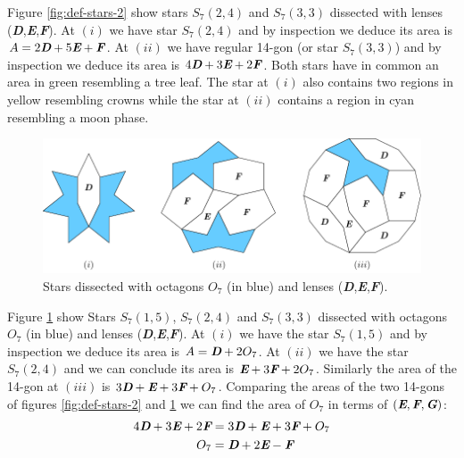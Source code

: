 \documentclass[11pt]{article}
\def\mathbi#1{\textbf{\em #1}}
\begin{document}
Figure \ref{fig:def-stars-2} show stars $S_7(2,4)$ and $S_7(3,3)$ dissected with lenses (\mathbi{D},\mathbi{E},\mathbi{F}).
At $(i)$ we have star $S_7(2,4)$ and by inspection we deduce its area is $A = 2\mathbi{D} + 5\mathbi{E} + \mathbi{F}$. At $(ii)$ we have regular 14-gon (or star $S_7(3,3)$) and by inspection we deduce its area is $4\mathbi{D} + 3\mathbi{E} + 2\mathbi{F}$. Both stars have in common an area in green resembling a tree leaf. The star at $(i)$ also contains two regions in yellow resembling crowns while the star at $(ii)$ contains a region in cyan resembling a moon phase.

\begin{figure}[H]
\centering
\includegraphics[scale=1.1]{def/def-stars-3}
\caption{Stars dissected with octagons \mathbi{$O_7$} (in blue) and lenses (\mathbi{D},\mathbi{E},\mathbi{F}).}
\label{fig:def-stars-3}
\end{figure}
 
Figure \ref{fig:def-stars-3} show Stars $S_7(1,5)$, $S_7(2,4)$ and $S_7(3,3)$ dissected with octagons \mathbi{$O_7$} (in blue) and lenses (\mathbi{D},\mathbi{E},\mathbi{F}). At $(i)$ we have the star $S_7(1,5)$ and by inspection we deduce its area is $A = \mathbi{D} + 2\mathbi{$O_7$}$. At $(ii)$ we have the star $S_7(2,4)$ and we can conclude its area is $\mathbi{E} + 3\mathbi{F} + 2\mathbi{$O_7$}$. Similarly the area of the 14-gon at $(iii)$ is $3\mathbi{D} + \mathbi{E} + 3\mathbi{F} + \mathbi{$O_7$}$. Comparing the areas of the two 14-gons of figures \ref{fig:def-stars-2} and \ref{fig:def-stars-3} we can find the area of \mathbi{$O_7$} in terms of $(\mathbi{E},\mathbi{F},\mathbi{G})$:
\begin{align}
4\mathbi{D} + 3\mathbi{E} + 2\mathbi{F} &= 
 3\mathbi{D} + \mathbi{E} + 3\mathbi{F} + \mathbi{$O_7$}\nonumber\\
\mathbi{$O_7$} &= \mathbi{D} + 2\mathbi{E} - \mathbi{F}
\end{align}
\end{document}
